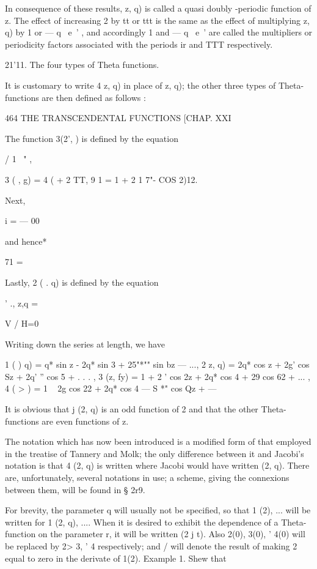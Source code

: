 In consequence of these results, z, q) is called a quasi doubly
-periodic function of z. The effect of increasing 2 by tt or ttt is
the same as the effect of multiplying z, q) by 1 or — q~ e~' , and
accordingly 1 and — q~ e~' are called the multipliers or periodicity
factors associated with the periods ir and TTT respectively.

21'11. The four types of Theta functions.

It is customary to write 4 z, q) in place of z, q); the other three
types of Theta-functions are then defined as follows :

464 THE TRANSCENDENTAL FUNCTIONS [CHAP. XXI

The function 3(2', ) is defined by the equation

/ 1 \ " ,

 3 ( , g) = 4 ( + 2 TT, 9 1 = 1 + 2 1 7"- COS 2)12.

Next, %

 i = — 00

and hence* %

71 =

Lastly, 2 ( . q) is defined by the equation

' ., z,q = %

V / H=0

Writing down the series at length, we have

 1 ( ) q) = q* sin z - 2q* sin 3 + 25"*"" sin bz — ..., 2 z, q) = 2q*
cos z + 2g' cos Sz + 2q' '' cos 5 + . . . , 3 (z, fy) = 1 + 2 ' cos 2z
+ 2q* cos 4 + 29 cos 62 + ... , 4 ( > ) = 1 ~ 2g cos 22 + 2q* cos 4 —
S *" cos Qz + —

It is obvious that j (2, q) is an odd function of 2 and that the other
Theta-functions are even functions of z.

The notation which has now been introduced is a modified form of that
employed in the treatise of Tannery and Molk; the only difference
between it and Jacobi's notation is that 4 (2, q) is written where
Jacobi would have written (2, q). There are, unfortunately, several
notations in use; a scheme, giving the connexions between them, will
be found in § 2r9.

For brevity, the parameter q will usually not be specified, so that 1
(2), ... will be written for 1 (2, q), .... When it is desired to
exhibit the dependence of a Theta-function on the parameter r, it will
be written (2 j t). Also 2(0), 3(0), ' 4(0) will be replaced by 2> 3,
' 4 respectively; and / will denote the result of making 2 equal to
zero in the derivate of 1(2). Example 1. Shew that

